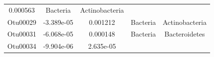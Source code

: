 \documentclass[]{article}
\begin{document}
\begin{longtable}[]{@{}ccccc@{}}
\begin{minipage}[t]{0.14\columnwidth}
0.000563\strut
\end{minipage} & \begin{minipage}[t]{0.13\columnwidth}\centering\strut
Bacteria\strut
\end{minipage} & \begin{minipage}[t]{0.27\columnwidth}\centering\strut
Actinobacteria\strut
\end{minipage}\tabularnewline
\begin{minipage}[t]{0.13\columnwidth}\centering\strut
Otu00029\strut
\end{minipage} & \begin{minipage}[t]{0.16\columnwidth}\centering\strut
-3.389e-05\strut
\end{minipage} & \begin{minipage}[t]{0.14\columnwidth}\centering\strut
0.001212\strut
\end{minipage} & \begin{minipage}[t]{0.13\columnwidth}\centering\strut
Bacteria\strut
\end{minipage} & \begin{minipage}[t]{0.27\columnwidth}\centering\strut
Actinobacteria\strut
\end{minipage}\tabularnewline
\begin{minipage}[t]{0.13\columnwidth}\centering\strut
Otu00031\strut
\end{minipage} & \begin{minipage}[t]{0.16\columnwidth}\centering\strut
-6.068e-05\strut
\end{minipage} & \begin{minipage}[t]{0.14\columnwidth}\centering\strut
0.000148\strut
\end{minipage} & \begin{minipage}[t]{0.13\columnwidth}\centering\strut
Bacteria\strut
\end{minipage} & \begin{minipage}[t]{0.27\columnwidth}\centering\strut
Bacteroidetes\strut
\end{minipage}\tabularnewline
\begin{minipage}[t]{0.13\columnwidth}\centering\strut
Otu00034\strut
\end{minipage} & \begin{minipage}[t]{0.16\columnwidth}\centering\strut
-9.904e-06\strut
\end{minipage} & \begin{minipage}[t]{0.14\columnwidth}\centering\strut
2.635e-05\strut
\end{minipage} & \begin{minipage}[t]{0.13\columnwidth}\centering\strut

\end{minipage}
\end{longtable}
\end{document}
